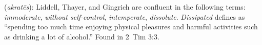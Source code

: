 \item[Dissipated,]

(\textit{akratēs}):
Liddell, Thayer, and Gingrich are confluent in the following terms: \emph{immoderate}, \emph{without self-control}, \emph{intemperate}, \emph{dissolute}. \emph{Dissipated} defines as ``spending too much time enjoying physical pleasures and harmful activities such as drinking a lot of alcohol.''
Found in 2~Tim 3:3.
